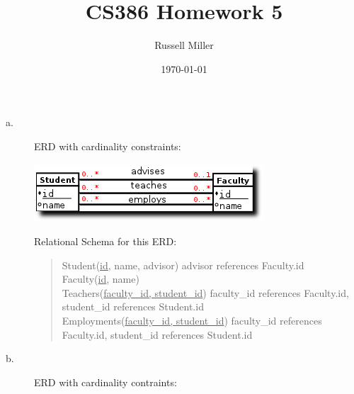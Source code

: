\documentclass{article}
\title{CS386 Homework 5}
\author{Russell Miller}
\date{\today}
\begin{document}
\maketitle

\section{}
\begin{description}
\item[a.]
ERD with cardinality constraints:\footnotemark\\
\begin{center}
 \includegraphics[scale=.8]{1a.png}
\end{center}
Relational Schema for this ERD:
\begin{quote}
Student(\underline{id}, name, advisor) advisor references Faculty.id\\
Faculty(\underline{id}, name)\\
Teachers(\underline{faculty\_id, student\_id}) faculty\_id references Faculty.id, student\_id 
references Student.id\\
Employments(\underline{faculty\_id, student\_id}) faculty\_id references Faculty.id, student\_id 
references Student.id\\
\end{quote}

\item[b.]
ERD with cardinality contraints:\\
\begin{center}
 
\end{center}
\end{description}
\end{document}
